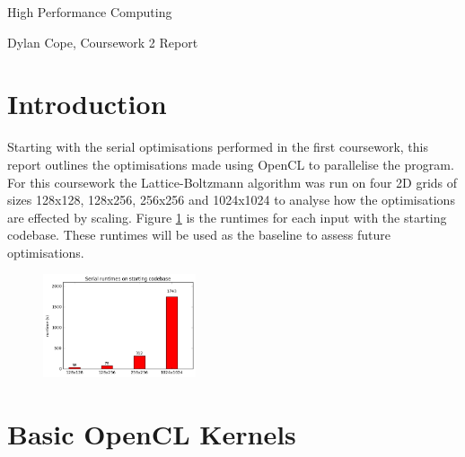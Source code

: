 \documentclass[12pt, a4paper]{article}
\begin{document}
  \vspace{.1in}
	\begin{center}
	{ \Large High Performance Computing }

  \end{center}
  \begin{center}

	Dylan Cope, Coursework 2 Report

	\vspace{.1in}

	\end{center}

  \section*{Introduction}

  \begin{multicols}{2}

    Starting with the serial optimisations performed in the first coursework, this report outlines the optimisations made using OpenCL to parallelise the program. For this coursework the Lattice-Boltzmann algorithm was run on four 2D grids of sizes 128x128, 128x256, 256x256 and 1024x1024 to analyse how the optimisations are effected by scaling. Figure \ref{serial} is the runtimes for each input with the starting codebase. These runtimes will be used as the baseline to assess future optimisations.

    \begin{figure}[H]
      \caption{} \vspace{-0.8cm}
      \label{serial}
      \begin{center}
        \includegraphics[width=0.4\textwidth]{figures/serial}
      \end{center}
    \end{figure}

  \end{multicols}

  \section*{Basic OpenCL Kernels}
\end{document}
